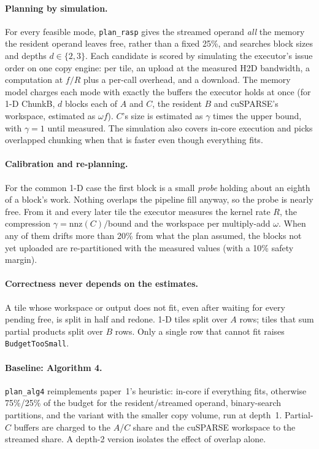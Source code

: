 \paragraph{Planning by simulation.} For every feasible mode, \texttt{plan\_rasp} gives the streamed operand
\emph{all} the memory the resident operand leaves free, rather than a fixed 25\%, and searches block sizes and depths
$d\in\{2,3\}$. Each candidate is scored by simulating the executor's issue order on one copy engine: per tile, an
upload at the measured H2D bandwidth, a computation at $f/R$ plus a per-call overhead, and a download. The memory
model charges each mode with exactly the buffers the executor holds at once (for 1-D ChunkB, $d$ blocks each of
$A$ and $C$, the resident $B$ and cuSPARSE's workspace, estimated as $\omega f$). $C$'s size is estimated as
$\gamma$ times the upper bound, with $\gamma = 1$ until measured. The simulation also covers in-core execution and
picks overlapped chunking when that is faster even though everything fits.

\paragraph{Calibration and re-planning.} For the common 1-D case the first block is a small \emph{probe} holding
about an eighth of a block's work. Nothing overlaps the pipeline fill anyway, so the probe is nearly free. From it
and every later tile the executor measures the kernel rate $R$, the compression $\gamma = \mathrm{nnz}(C)/$bound and
the workspace per multiply-add $\omega$. When any of them drifts more than 20\% from what the plan assumed, the
blocks not yet uploaded are re-partitioned with the measured values (with a 10\% safety margin).

\paragraph{Correctness never depends on the estimates.} A tile whose workspace or output does not fit, even after
waiting for every pending free, is split in half and redone. 1-D tiles split over $A$ rows; tiles that sum partial
products split over $B$ rows. Only a single row that cannot fit raises \texttt{BudgetTooSmall}.

\paragraph{Baseline: Algorithm 4.} \texttt{plan\_alg4} reimplements paper~1's heuristic: in-core if everything fits,
otherwise 75\%/25\% of the budget for the resident/streamed operand, binary-search partitions, and the variant with
the smaller copy volume, run at depth~1. Partial-$C$ buffers are charged to the $A$/$C$ share and the cuSPARSE
workspace to the streamed share. A depth-2 version isolates the effect of overlap alone.
